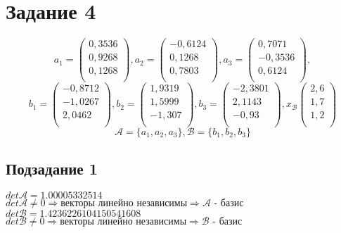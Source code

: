 \documentclass{article}
\begin{document}
    \section{Задание 4}
    \[
    a_1 =
    \begin{pmatrix}
        0,3536 \\
        0,9268 \\
        0,1268 \\
    \end{pmatrix},
    a_2 =
    \begin{pmatrix}
        -0,6124 \\
        0,1268 \\
        0,7803 \\
    \end{pmatrix},
    a_3 =
    \begin{pmatrix}
        0,7071 \\
        -0,3536 \\
        0,6124 \\
    \end{pmatrix},
    \]
    \[
    b_1 =
    \begin{pmatrix}
        -0,8712 \\
        -1,0267 \\
        2,0462 \\
    \end{pmatrix},
    b_2 =
    \begin{pmatrix}
        1,9319 \\
        1,5999 \\
        -1,307 \\
    \end{pmatrix},
    b_3 =
    \begin{pmatrix}
        -2,3801 \\
        2,1143 \\
        -0,93 \\
    \end{pmatrix},
    x_\mathcal{B}
    \begin{pmatrix}
        2,6 \\
        1,7 \\
        1,2 \\
    \end{pmatrix}
    \]
    \[
    \mathcal{A} = \{a_1, a_2, a_3\}, \mathcal{B} = \{b_1, b_2, b_3\}
    \]
    \subsection{Подзадание 1}
    $det \mathcal{A} = 1.00005332514$ \\
    $det \mathcal{A} \neq 0 \Rightarrow \text{векторы линейно независимы} \Rightarrow \mathcal{A} \text{ - базис}$ \\
    $det \mathcal{B} = 1.4236226104150541608$ \\
    $det \mathcal{B} \neq 0 \Rightarrow \text{векторы линейно независимы} \Rightarrow \mathcal{B} \text{ - базис}$
    
\end{document}
